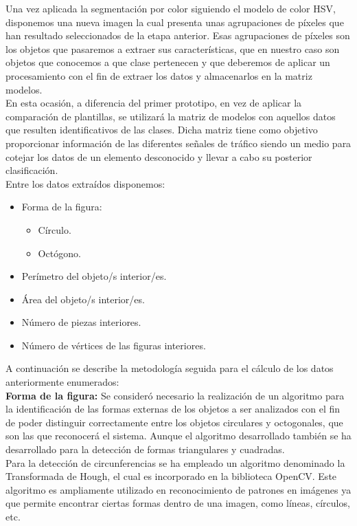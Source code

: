 Una vez aplicada la segmentación por color siguiendo el modelo de color HSV, disponemos una nueva imagen la cual presenta unas agrupaciones de píxeles que han resultado seleccionados de la etapa anterior. Esas agrupaciones de píxeles son los objetos  que pasaremos a extraer sus características, que en nuestro caso son objetos que conocemos a que clase pertenecen y que deberemos de aplicar un procesamiento con el fin de extraer los datos y almacenarlos en la matriz modelos.\\

En esta ocasión, a diferencia del primer prototipo, en vez de aplicar la comparación de plantillas, se utilizará la matriz de modelos con aquellos datos que resulten identificativos de las clases. Dicha matriz tiene como objetivo proporcionar información de las diferentes señales de tráfico siendo un medio para cotejar los datos de un elemento desconocido y llevar a cabo su posterior clasificación.\\

Entre los datos extraídos disponemos:

\begin{itemize}
\item Forma de la figura:
  \begin{itemize}
  \item Círculo.
  \item Octógono.
  \end{itemize}
\item Perímetro del objeto/s interior/es.
\item Área del objeto/s interior/es.
\item Número de piezas interiores.
\item Número de vértices de las figuras interiores.
\end{itemize}

A continuación se describe la metodología seguida para el cálculo de los datos anteriormente enumerados:\\

\textbf{Forma de la figura:}
Se consideró necesario la realización de un algoritmo para la identificación de las formas externas de los objetos a ser analizados con el fin de poder distinguir correctamente entre los objetos circulares y octogonales, que son las que reconocerá el sistema. Aunque el algoritmo desarrollado también se ha desarrollado para la detección de formas triangulares y cuadradas.\\

Para la detección de circunferencias se ha empleado un algoritmo denominado la Transformada de Hough, el cual es incorporado en la biblioteca OpenCV. Este algoritmo es ampliamente utilizado en reconocimiento de patrones en imágenes ya que permite encontrar ciertas formas dentro de una imagen, como líneas, círculos, etc. \\

